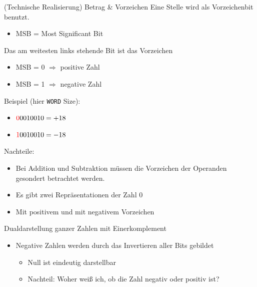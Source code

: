 \documentclass[12pt%
,aspectratio=169%
]{beamer}
\begin{document}
\begin{frame}{(Technische Realisierung) Betrag \& Vorzeichen}
Eine Stelle wird als Vorzeichenbit benutzt.\\
\begin{itemize}
	\item MSB = Most Significant Bit
\end{itemize}
Das am weitesten links stehende Bit ist das Vorzeichen
\begin{itemize}
	\item MSB = 0 $\Rightarrow$ positive Zahl
	\item MSB = 1 $\Rightarrow$ negative Zahl
\end{itemize}
Beispiel (hier \texttt{WORD} Size):
\begin{itemize}
	\item $\textcolor{red}{0}001 0010 = +18$
	\item $\textcolor{red}{1}001 0010 = -18$
\end{itemize}
Nachteile:
\begin{itemize}
	\item Bei Addition und Subtraktion müssen die Vorzeichen der Operanden gesondert betrachtet werden.
	\item Es gibt zwei Repräsentationen der Zahl $0$
	\item Mit positivem und mit negativem Vorzeichen
\end{itemize}
\end{frame}

\begin{frame}{Dualdarstellung ganzer Zahlen mit Einerkomplement}
\begin{itemize}
	\item Negative Zahlen werden durch das Invertieren aller Bits gebildet
	\begin{itemize}
		\item Null ist eindeutig darstellbar
		\item Nachteil: Woher weiß ich, ob die Zahl negativ oder positiv ist?
	\end{itemize}
\end{itemize}
\end{frame}
\end{document}
